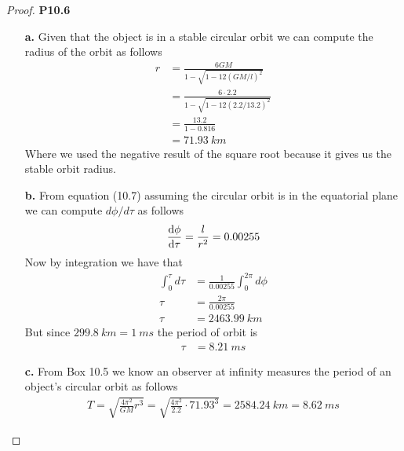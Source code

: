 \documentclass[11pt]{article}
\theoremstyle{definition}
\begin{document}
\cleardoublepage
\begin{proof}{\textbf{P10.6}}
\begin{itemize}
    \item [\textbf{a.}] Given that the object is in a stable circular orbit we
    can compute the radius of the orbit as follows
    \begin{align*}
        r &= \frac{6GM}{1 - \sqrt{1 - 12(GM/l)^2}}\\ 
        &= \frac{6\cdot 2.2}{1 - \sqrt{1 - 12(2.2/13.2)^2}}\\
        &= \frac{13.2}{1 - 0.816}\\
        &= 71.93~km
    \end{align*}
    Where we used the negative result of the square root because it gives us
    the stable orbit radius.
    \item [\textbf{b.}] From equation (10.7) assuming the circular orbit is
    in the equatorial plane we can compute $d\phi/d\tau$ as follows
    \begin{align*}
        \dv{\phi}{\tau} = \frac{l}{r^2} = 0.00255
    \end{align*}
    Now by integration we have that
    \begin{align*}
        \int_0^\tau d\tau &= \frac{1}{0.00255} \int_0^{2\pi} d\phi\\
        \tau &= \frac{2\pi}{0.00255}\\
        \tau &= 2463.99 ~km
    \end{align*}
    But since $299.8~km = 1~ms$ the period of orbit is
    \begin{align*}
        \tau &= 8.21~ms
    \end{align*}
    \item [\textbf{c.}] From Box 10.5 we know an observer at infinity
    measures the period of an object's circular orbit as follows
    \begin{align*}
         T = \sqrt{\frac{4\pi^2}{GM} r^3} = \sqrt{\frac{4\pi^2}{2.2} \cdot 71.93^3}
         = 2584.24~km = 8.62~ms 
    \end{align*}
\end{itemize}
\end{proof}
\cleardoublepage
\end{document}
